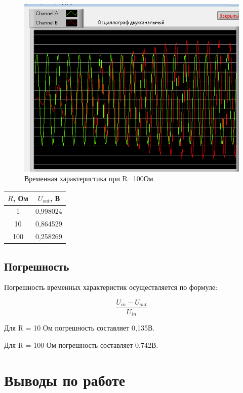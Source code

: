 \documentclass[a4paper,14pt]{article}
\begin{document}
\begin{figure}[H]
	\centering
	\includegraphics[width=0.5\linewidth]{image/time_100}
	\caption{Временная характеристика при R=100Ом}
	\label{fig:time_100}
\end{figure}

\begin{table}[H]
	\begin{center}
		\begin{flushleft}
		\end{flushleft}
		\label{tab:task_1}
		\begin{tabular}{|c|c|}
			\hline
			$R$, Ом & $U_{out}$, В \\ \hline
			1       & 0,998024     \\ \hline
			10      & 0,864529     \\ \hline
			100     & 0,258269     \\ \hline
		\end{tabular}
	\end{center}
\end{table}

\subsection{Погрешность}

Погрешность временных характеристик осуществляется по формуле:

\begin{equation}
\frac{U_{in} - U_{out}}{U_{in}}
\end{equation}

Для R = 10 Ом погрешность составляет 0,135В.

Для R = 100 Ом погрешность составляет 0,742В.

\section{Выводы по работе}
\end{document}
